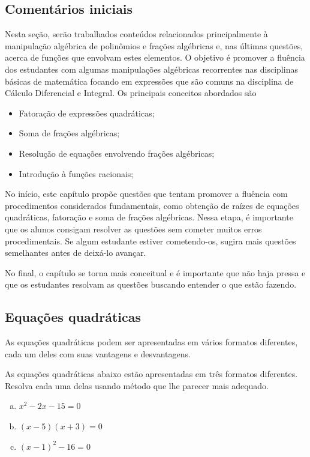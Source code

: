 \documentclass[main.tex]{subfiles}
\begin{document}
\subsection{Comentários iniciais}

Nesta seção, serão trabalhados conteúdos relacionados principalmente à manipulação algébrica de polinômios e frações algébricas e, nas últimas questões, acerca de funções que envolvam estes elementos. O objetivo é promover a fluência dos estudantes com algumas manipulações algébricas recorrentes nas disciplinas básicas de matemática focando em expressões que são comuns na disciplina de Cálculo Diferencial e Integral. Os principais conceitos abordados são

\begin{itemize}
 \item Fatoração de expressões quadráticas;
 \item Soma de frações algébricas;
 \item Resolução de equações envolvendo frações algébricas;
 \item Introdução à funções racionais;
\end{itemize}

No início, este capítulo propõe questões que tentam promover a fluência com procedimentos considerados fundamentais, como obtenção de raízes de equações quadráticas, fatoração e soma de frações algébricas. Nessa etapa, é importante que os alunos consigam resolver as questões sem cometer muitos erros procedimentais. Se algum estudante estiver cometendo-os, sugira mais questões semelhantes antes de deixá-lo avançar.

No final, o capítulo se torna mais conceitual e é importante que não haja pressa e que os estudantes resolvam as questões buscando entender o que estão fazendo.

\paraAmbos

\subsection*{Equações quadráticas}

As equações quadráticas podem ser apresentadas em vários formatos diferentes, cada um deles com suas vantagens e desvantagens. 

\begin{questao}
 As equações quadráticas abaixo estão apresentadas em três formatos diferentes. Resolva cada uma delas usando método que lhe parecer mais adequado.
\begin{enumerate}[a)]
\item $x^2-2x-15=0$
\item $(x-5)(x+3)=0$
\item $(x-1)^2-16=0$
\end{enumerate}
\end{questao}
\end{document}

